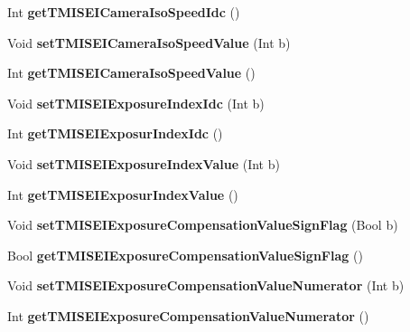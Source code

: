 \begin{DoxyCompactItemize}
Int {\bfseries get\+T\+M\+I\+S\+E\+I\+Camera\+Iso\+Speed\+Idc} ()
\item 
\mbox{\label{class_t_enc_cfg_a54d01a497c78378a4b9a297376f49f6a}} 
Void {\bfseries set\+T\+M\+I\+S\+E\+I\+Camera\+Iso\+Speed\+Value} (Int b)
\item 
\mbox{\label{class_t_enc_cfg_a46dc1686eb76963525dfe3615e66f6ac}} 
Int {\bfseries get\+T\+M\+I\+S\+E\+I\+Camera\+Iso\+Speed\+Value} ()
\item 
\mbox{\label{class_t_enc_cfg_a6aecb0a64ad42dcf6f5bdcd70c083db0}} 
Void {\bfseries set\+T\+M\+I\+S\+E\+I\+Exposure\+Index\+Idc} (Int b)
\item 
\mbox{\label{class_t_enc_cfg_ab6d078cc790ffa36bfad9e85fc7536a9}} 
Int {\bfseries get\+T\+M\+I\+S\+E\+I\+Exposur\+Index\+Idc} ()
\item 
\mbox{\label{class_t_enc_cfg_a4880ff3fa2b42d18a7236f83ff479a82}} 
Void {\bfseries set\+T\+M\+I\+S\+E\+I\+Exposure\+Index\+Value} (Int b)
\item 
\mbox{\label{class_t_enc_cfg_a3e05da0cb9d08be0010bdca5160a9352}} 
Int {\bfseries get\+T\+M\+I\+S\+E\+I\+Exposur\+Index\+Value} ()
\item 
\mbox{\label{class_t_enc_cfg_ada151553d07f5a2fef9afcae4815e92a}} 
Void {\bfseries set\+T\+M\+I\+S\+E\+I\+Exposure\+Compensation\+Value\+Sign\+Flag} (Bool b)
\item 
\mbox{\label{class_t_enc_cfg_a23ed9692ec2f47bb4c3513149efecb1c}} 
Bool {\bfseries get\+T\+M\+I\+S\+E\+I\+Exposure\+Compensation\+Value\+Sign\+Flag} ()
\item 
\mbox{\label{class_t_enc_cfg_a607558f4576034e7bc4ac8c0ff4abc97}} 
Void {\bfseries set\+T\+M\+I\+S\+E\+I\+Exposure\+Compensation\+Value\+Numerator} (Int b)
\item 
\mbox{\label{class_t_enc_cfg_a50a95540606de1e90a54dfe43b6c4fdc}} 
Int {\bfseries get\+T\+M\+I\+S\+E\+I\+Exposure\+Compensation\+Value\+Numerator} ()
\item 

\end{DoxyCompactItemize}
